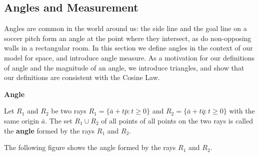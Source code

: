 \subsection{Angles and Measurement}

Angles are common in the world around us: the side line and the goal line on a soccer pitch
form an angle at the point where they intersect, as do non-opposing walls in a rectangular
room. In this section we define angles in the context of our model for space, and introduce
angle measure. As a motivation for our definitions of angle and the magnitude of an angle,
we introduce triangles, and show that our definitions are consistent with the Cosine Law.

\begin{definitionbox}
\textbf{Angle}

Let \(R_1\) and \(R_2\) be two rays \(R_1 = \{\bar{a} + t\bar{p} : t \geq 0\}\) and \(R_2 = \{\bar{a} + t\bar{q} : t \geq 0\}\) with the same
origin \(\bar{a}\). The set \(R_1 \cup R_2\) of all points of all points on the two rays is called the \textbf{angle} formed by the rays \(R_1\) and \(R_2\).
\end{definitionbox}

The following figure shows the angle formed by the rays \(R_1\) and \(R_2\).

\begin{center}
\end{center}

